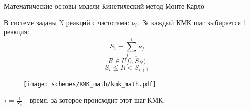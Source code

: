 \documentclass{beamer}%
\begin{document}












\begin{frame}{Математические основы модели} {Кинетический метод Монте-Карло}



В системе заданы N реакций с частотами: $\nu_i$.\
За каждый КМК шаг выбирается 1 реакция:
\[S_i = \sum_{j=1}^{i}{\nu_j}\]
\[R \in U[0,S_N)\]
\[S_i \le R < S_{i+1}\] 

\begin{figure}
    \centering
    \texttt{[image: schemes/KMK\_math/kmk\_math.pdf]}
\end{figure}

$\tau = \frac{1}{S_N}$ - время, за которое происходит этот шаг КМК.

\end{frame}

\end{document}
